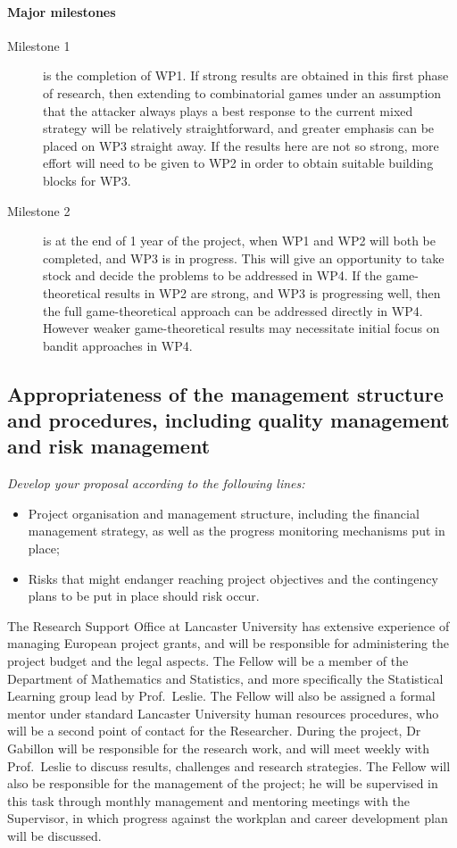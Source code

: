 \documentclass[a4paper,11pt]{article}
\begin{document}
\paragraph{Major milestones}
\begin{description}
\item[Milestone 1] is the completion of WP1. If strong results are obtained in this first phase of research, then extending to combinatorial games under an assumption that the attacker always plays a best response to the current mixed strategy will be relatively straightforward, and greater emphasis can be placed on WP3 straight away.  If the results here are not so strong, more effort will need to be given to WP2 in order to obtain suitable building blocks for WP3.
\item[Milestone 2] is at the end of 1 year of the project, when WP1 and WP2 will both be completed, and WP3 is in progress. This will give an opportunity to take stock and decide the problems to be addressed in WP4. If the game-theoretical results in WP2 are strong, and WP3 is progressing well, then the full game-theoretical approach can be addressed directly in WP4.  However weaker game-theoretical results may necessitate initial focus on bandit approaches in WP4.
\end{description}

\subsection{Appropriateness of the management structure and procedures, including quality management and risk management}

{\em
Develop your proposal according to the following lines:
\begin{itemize}
\item Project organisation and management structure, including the financial management strategy, as well as the progress monitoring mechanisms put in place;
\item Risks that might endanger reaching project objectives and the contingency plans to be put in place should risk occur.
\end{itemize}
}

The Research Support Office at Lancaster University has extensive experience of managing European project grants, and will be responsible for administering the project budget and the legal aspects.  The Fellow will be a member of the Department of Mathematics and Statistics, and more specifically the Statistical Learning group lead by Prof.\ Leslie.  The Fellow will also be assigned a formal mentor under standard Lancaster University human resources procedures, who will be a second point of contact for the Researcher.  During the project, Dr Gabillon will be responsible for the research work, and will meet weekly with Prof.\ Leslie to discuss results, challenges and research strategies.  The Fellow will also be responsible for the management of the project; he will be supervised in this task through monthly management and mentoring meetings with the Supervisor, in which progress against the workplan and career development plan will be discussed.
\end{document}
